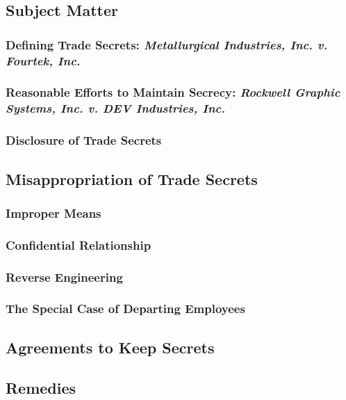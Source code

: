 \subsection{Subject Matter}

\subsubsection{Defining Trade Secrets: \emph{Metallurgical Industries, Inc. v. 
Fourtek, Inc.}}


\subsubsection{Reasonable Efforts to Maintain Secrecy: \emph{Rockwell Graphic 
Systems, Inc. v. DEV Industries, Inc.}}


\subsubsection{Disclosure of Trade Secrets}


\subsection{Misappropriation of Trade Secrets}

\subsubsection{Improper Means}


\subsubsection{Confidential Relationship}


\subsubsection{Reverse Engineering}


\subsubsection{The Special Case of Departing Employees}


\subsection{Agreements to Keep Secrets}


\subsection{Remedies}

